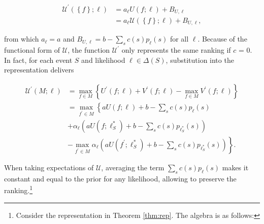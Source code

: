 \begin{corproof}
	\begin{align*}
		\mathcal{U}^{\prime} \left( \left\{ f \right\} ; \ell \right) & = a_{\ell} U \left( f ; \ell \right) + B_{U, \ell}                              \\
		                                                              & = a_{\ell} \mathcal{U} \left( \left\{ f \right\} ; \ell \right) + B_{U, \ell} ,
	\end{align*}

	from which \( a_{\ell} = a \) and \( B_{U,\ell} = b - \sum_{s} c \left( s \right) p_{\ell} \left( s \right) \) for all \( \ell \). Because of the functional form of \( \mathcal{U} \), the function \( \mathcal{U}^{\prime} \) only represents the same ranking if \( c \) = 0. In fact, for each event \( S \) and likelihood \( \ell \in \Delta \left( S \right) \), substitution into the representation delivers

	\begin{align*}
		\mathcal{U}^{\prime} \left( M ; \ell \right) & = \max _{f \in M}\left\{U^{\prime} \left( f ; \ell \right) + V^{\prime} \left(f ; \ell \right) - \max _{f \in M} V^{\prime} \left(f ; \ell \right) \right\}                              \\
		                                             & = \max _{f^{\prime} \in M}\left\{a U \left( f ; \ell \right) + b - \sum_{s} c \left( s \right) p_{\ell} \left( s \right) \right.                                                         \\
		                                             & \left. + \alpha_{\ell} \left( a U \left(f ; \ell^{*}_{S} \right) + b - \sum_{s} c \left( s \right) p_{\ell^{*}_{S}} \left( s \right) \right)\right.                                      \\
		                                             & \left. - \max _{f^{\prime} \in M} \alpha_{\ell} \left( a U \left(f^{\prime} ; \ell^{*}_{S} \right) + b - \sum_{s} c \left( s \right) p_{\ell^{*}_{S}} \left( s \right) \right) \right\}.
	\end{align*}

	When taking expectations of \( \mathcal{U} \), averaging the term \( \sum_{s} c \left( s \right) p_{\ell} \left( s \right) \) makes it constant and equal to the prior for any likelihood, allowing to preserve the ranking.\footnote{Consider the representation in Theorem \ref{thm:rep}. The algebra is as follows:

}
\end{corproof}
